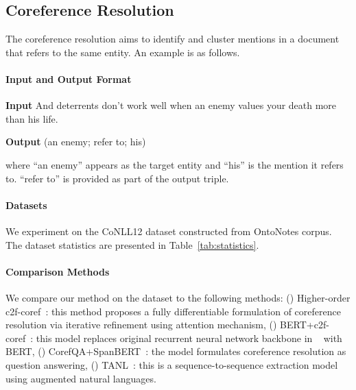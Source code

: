 \subsection{Coreference Resolution}
The coreference resolution aims to identify and cluster mentions in a document that refers to the same entity. An example is as follows.

\paragraph{Input and Output Format}
\begin{enumerate*}
    \item[] {\bf Input} And deterrents don't work well when an enemy values your death more than his life.
    \item[] {\bf Output} (an enemy; refer to; his)
\end{enumerate*}

\noindent where ``an enemy'' appears as the target entity and ``his'' is the mention it refers to. ``refer to'' is provided as part of the output triple.

\paragraph{Datasets}
We experiment on the CoNLL12 \citep{pradhan-etal-2013-towards} dataset constructed from OntoNotes corpus. The dataset statistics are presented in Table~\ref{tab:statistics}. 

\paragraph{Comparison Methods}
We compare our method \method on the dataset to the following methods: (\expandafter{}) Higher-order c2f-coref~\cite{lee2018higherorder}: this method proposes a fully differentiable formulation of coreference resolution via iterative refinement using attention mechanism, (\expandafter{}) BERT+c2f-coref~\cite{joshi2019bert}: this model replaces original recurrent neural network backbone in ~\cite{lee2018higherorder} with BERT, (\expandafter{}) CorefQA+SpanBERT~\cite{wu-etal-2020-corefqa}: the model formulates coreference resolution as question answering, (\expandafter{}) TANL~\cite{paolini2021structured}: this is a sequence-to-sequence extraction model using augmented natural languages.


